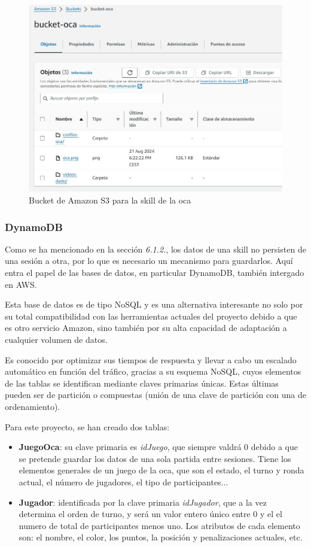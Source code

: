 \begin{figure}[H]
	\centering
	\includegraphics[width=1\textwidth]{imgs/aws-s3-1.jpg}
	\caption{Bucket de Amazon S3 para la skill de la oca}
	\label{fig:aws-s3-1}
\end{figure}

\subsubsection{DynamoDB}

Como se ha mencionado en la sección \textit{6.1.2.}, los datos de una skill no persisten de una sesión a otra, por lo que es necesario un mecanismo para guardarlos. Aquí entra el papel de las bases de datos, en particular DynamoDB, también intergado en AWS.

Esta base de datos es de tipo NoSQL y es una alternativa interesante no solo por su total compatibilidad con las herramientas actuales del proyecto debido a que es otro servicio Amazon, sino también por su alta capacidad de adaptación a cualquier volumen de datos. 

Es conocido por optimizar sus tiempos de respuesta y llevar a cabo un escalado automático en función del tráfico, gracias a su esquema NoSQL, cuyos elementos de las tablas se identifican mediante claves primarias únicas. Estas últimas pueden ser de partición o compuestas (unión de una clave de partición con una de ordenamiento).

Para este proyecto, se han creado dos tablas: 
\begin{itemize}
	\item \textbf{JuegoOca}: su clave primaria es \textit{idJuego}, que siempre valdrá 0 debido a que se pretende guardar los datos de una sola partida entre sesiones. Tiene los elementos generales de un juego de la oca, que son el estado, el turno y ronda actual, el número de jugadores, el tipo de participantes...
	\item \textbf{Jugador}: identificada por la clave primaria \textit{idJugador}, que a la vez determina el orden de turno, y será un valor entero único entre 0 y el el numero de total de participantes menos uno. Los atributos de cada elemento son: el nombre, el color, los puntos, la posición y penalizaciones actuales, etc.
\end{itemize} 

